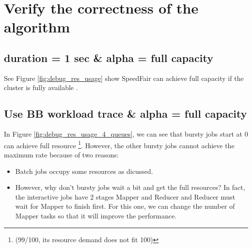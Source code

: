 \section{Verify the correctness of the algorithm}

\subsection{duration = 1 sec \& alpha = full capacity}

See Figure \ref{fig:debug_res_usage} show SpeedFair can achieve full capacity if the cluster is fully available .


\subsection{Use BB workload trace \& alpha = full capacity}

In Figure \ref{fig:debug_res_usage_4_queues}, we can see that bursty jobs start at 0 can achieve full resource \footnote{(99/100, its resource demand does not fit 100)}. However, the other bursty jobs cannot achieve the maximum rate because of two reasons:
\begin{itemize}
\item Batch jobs occupy some resources as dicussed.
\item However, why don't bursty jobs wait a bit and get the full resources? In fact, the interactive jobs have 2 stages Mapper and Reducer and Reducer must wait for Mapper to finish first. For this one, we can change the number of Mapper tasks so that it will improve the performance.
\end{itemize}

